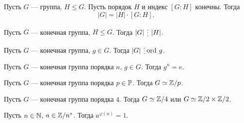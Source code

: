\begin{thm}
    Пусть $ G$ --- группа, $ H \le G$. Пусть порядок $ H$ и индекс  $ [G: H]$ конечны. Тогда 
     \[
	 \left| G \right|  = \left| H \right| \cdot [G:H]
    .\] 
\end{thm}
\begin{cor}
    Пусть $ G$ ---  конечная группа,  $ H \le G$. Тогда $ \left| G \right| \del \left| H \right| $.
\end{cor}
\begin{cor}
    Пусть $ G$ ---  конечная группа,  $ g \in  G$. Тогда $ \left| G \right| \del \ord g $.
\end{cor}
\begin{cor}
    Пусть $ G$ ---  конечная группа порядка $ n$,  $ g \in  G$. Тогда $ g^{n} = e$.
\end{cor}
\begin{cor}
    Пусть $ G$ ---  конечная группа порядка $ p \in \mathbb{P}$. Тогда $ G \simeq \mathbb{Z}/p$.
\end{cor}
\begin{cor}
    Пусть $ G$ ---  конечная группа порядка $4$. Тогда $ G \simeq \mathbb{Z}/4 $ или $ G \simeq \mathbb{Z} / 2 \times  \mathbb{Z} / 2$.
\end{cor}
\begin{cor}
    Пусть $ n \in \mathbb{N}$, $ a \in \mathbb{Z} /n ^*$. Тогда $ a^{\varphi (n)} = 1$.
\end{cor}
% 
